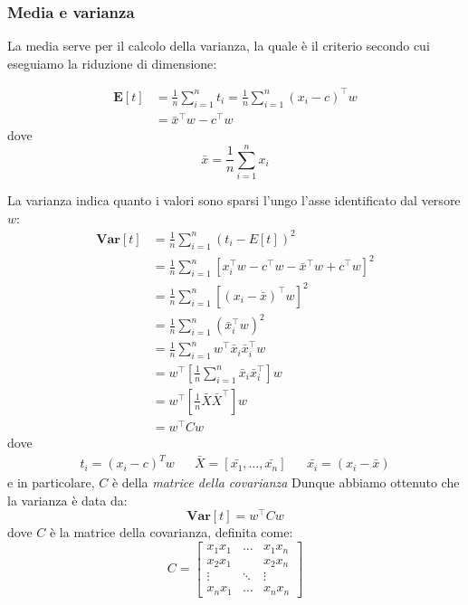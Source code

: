 \subsubsection{Media e varianza}
La media serve per il calcolo della varianza, la quale è il criterio secondo cui eseguiamo la riduzione di dimensione:

\begin{align*}
	\mathbf{E}[t] & = \frac{1}{n} \sum_{i=1}^{n} t_i = \frac{1}{n} \sum_{i=1}^{n} (x_i - c)^\top w \\
	              & = \bar{x}^\top w - c^\top w
\end{align*}
dove
\[
	\bar{x} = \frac{1}{n} \sum_{i=1}^{n} x_i
\]


La varianza indica quanto i valori sono sparsi l'ungo l'asse identificato dal versore $ w $:
\begin{align*}
	\mathbf{Var}[t] & = \frac{1}{n} \sum_{i=1}^{n} (t_i - E[t])^2                                                    \\
	                & = \frac{1}{n} \sum_{i=1}^{n} \left[ x_i^\top w - c^\top w - \bar{x}^\top w + c^\top w\right]^2 \\
	                & = \frac{1}{n} \sum_{i=1}^{n} \left[ (x_i - \bar{x})^\top w \right]^2                           \\
	                & = \frac{1}{n} \sum_{i=1}^{n} \left( \bar{x}_i^\top w \right)^2                                 \\
	                & = \frac{1}{n} \sum_{i=1}^{n}  w^\top \bar{x}_i \bar{x}_i^\top w                                \\
	                & = w^\top \left[\frac{1}{n} \sum_{i=1}^{n}  \bar{x}_i \bar{x}_i^\top\right] w                   \\
	                & = w^\top \left[ \frac{1}{n} \bar{X} \bar{X}^\top \right] w                                     \\
	                & = w^\top C w
\end{align*}
dove
\begin{align*}
	t_i = \left(x_i - c\right)^{T}w &  & \bar{X} = \left[\bar{x_1}, \ldots , \bar{x_n}\right] &  & \bar{x_i} = \left(x_i - \bar{x}\right)
\end{align*}
e in particolare, $ C $ è della \textit{matrice della covarianza}
\vskip3mm
Dunque abbiamo ottenuto che la varianza è data da:
\[
	\mathbf{Var}[t] = w^\top C w
\]
dove $ C $ è la matrice della covarianza, definita come:
\[
	C =
	\begin{bmatrix}
		x_1 x_1 & \ldots & x_1 x_n \\
		x_2 x_1 &        & x_2 x_n \\
		\vdots  & \ddots & \vdots  \\
		x_n x_1 & \ldots & x_n x_n
	\end{bmatrix}
\]

